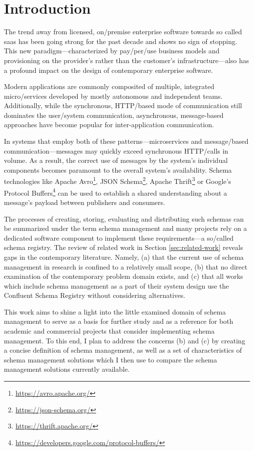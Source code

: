 
\section{Introduction}\label{sec:introduction}



The trend away from licensed, on\-/premise enterprise software towards so called \gls{saas} has been going strong for the past decade and shows no sign of stopping.
This new paradigm---characterized by pay\-/per\-/use business models and provisioning on the provider's rather than the customer's infrastructure---also has a profound impact on the design of contemporary enterprise software.

Modern applications are commonly composited of multiple, integrated micro\-/services developed by mostly autonomous and independent teams.
Additionally, while the synchronous, HTTP\-/based mode of communication still dominates the user\-/system communication, asynchronous, message-based approaches have become popular for  inter-application communication.

In systems that employ both of these patterns---microservices and message\-/based communication---messages may quickly exceed synchronous HTTP\-/calls in volume.
As a result, the correct use of messages by the system's individual components becomes paramount to the overall system's availability.
Schema technologies like Apache Avro\footnote{\url{https://avro.apache.org/}}, JSON Schema\footnote{\url{https://json-schema.org/}}, Apache Thrift\footnote{\url{https://thrift.apache.org/}} or Google's Protocol Buffers\footnote{\url{https://developers.google.com/protocol-buffers/}} can be used to establish a shared understanding about a message's payload between publishers and consumers.

The processes of creating, storing, evaluating and distributing such schemas can be summarized under the term schema management and many projects rely on a dedicated software component to implement these requirements---a so\-/called schema registry.
The review of related work in Section \ref{sec:related-work} reveals gaps in the contemporary literature.
Namely, (a) that the current use of schema management in research is confined to a relatively small scope, (b) that no direct examination of the contemporary problem domain exists, and (c) that all works which include schema management as a part of their system design use the Confluent Schema Registry without considering alternatives.

This work aims to shine a light into the little examined domain of schema management to serve as a basis for further study and as a reference for both academic and commercial projects that consider implementing schema management.
To this end, I plan to address the concerns (b) and (c) by creating a concise definition of schema management, as well as a set of characteristics of schema management solutions which I then use to compare the schema management solutions currently available.
